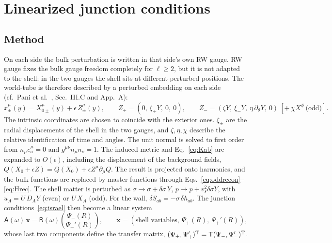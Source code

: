 \documentclass[11pt,a4paper]{article}
\numberwithin{equation}{section}
\begin{document}
\section{Linearized junction conditions}\label{sec:junction}
\subsection{Method}
On each side the bulk perturbation is written in that side's own RW gauge. RW gauge fixes the bulk gauge
freedom completely for $\ell\ge2$, but it is not adapted to the shell: in the two gauges the shell sits at different
perturbed positions. The world-tube is therefore described by a perturbed embedding on each side (cf.\ Pani et al.\
\cite{Pani09}, Sec.~III.C and App.~A):
\begin{equation}
x^\mu_\pm(y)=X^\mu_{0\pm}(y)+\epsilon\,Z^\mu_\pm(y),\qquad Z_+=(0,\ \xi_+Y,\ 0,\ 0),\qquad
Z_-=(\zeta Y,\ \xi_-Y,\ \eta\,\partial_\theta Y,\ 0)\ [+\ \chi X^\phi\ \text{(odd)}].
\label{eq:embed}
\end{equation}
The intrinsic coordinates are chosen to coincide with the exterior ones. $\xi_\pm$ are the radial displacements of
the shell in the two gauges, and $\zeta,\eta,\chi$ describe the relative identification of time and angles. The unit
normal is solved to first order from $n_\mu e^\mu_a=0$ and $g^{\mu\nu}n_\mu n_\nu=1$. The induced metric and
Eq.~\eqref{eq:Kab} are expanded to $O(\epsilon)$, including the displacement of the background fields,
$Q(X_0+\epsilon Z)=Q(X_0)+\epsilon Z^\mu\partial_\mu Q$. The result is projected onto harmonics, and the bulk
functions are replaced by master functions through Eqs.~\eqref{eq:oddrecon}--\eqref{eq:Hrec}. The shell matter is
perturbed as $\sigma\to\sigma+\delta\sigma\,Y$, $p\to p+v_s^2\delta\sigma Y$, with $u_A=U\,D_AY$ (even) or $U\,X_A$
(odd). For the wall, $\delta S_{ab}=-\sigma\,\delta h_{ab}$. The junction conditions~\eqref{eq:israel} then become a
linear system
\begin{equation}
\mathsf A(\omega)\,\bm x=\mathsf B(\omega)\binom{\Psi_-(R)}{\Psi_-'(R)},\qquad
\bm x=(\text{shell variables},\ \Psi_+(R),\ \Psi_+'(R)),
\label{eq:linsys}
\end{equation}
whose last two components define the transfer matrix, $(\Psi_+,\Psi_+')^{\rm T}=\mathsf T(\Psi_-,\Psi_-')^{\rm T}$.
\end{document}
